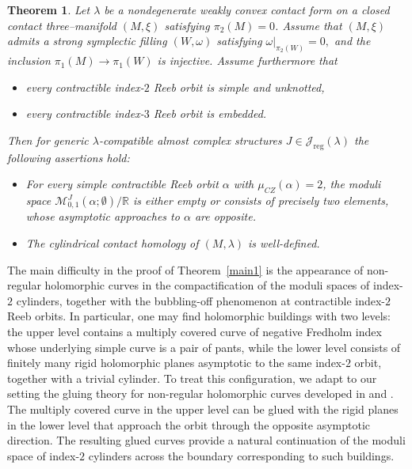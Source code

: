 \documentclass{amsart}
\newtheorem{theorem}{Theorem}[section]
\begin{document}
\begin{theorem}\label{main2}
Let $\lambda$ be a nondegenerate weakly convex contact form on a closed
contact three--manifold $(M,\xi)$ satisfying $\pi_2(M)=0$. 
Assume that $(M,\xi)$ admits a strong symplectic filling $(W,\omega)$
satisfying $\omega|_{\pi_2(W)}=0,$
and the inclusion
$\pi_1(M)\to\pi_1(W)$
is injective.
Assume furthermore that
\begin{itemize}
\item every contractible index-$2$ Reeb orbit is simple and unknotted,
\item every contractible index-$3$ Reeb orbit is embedded.
\end{itemize}
Then for generic $\lambda$-compatible almost complex structures
$J\in\mathcal{J}_{\mathrm{reg}}(\lambda)$ the following assertions hold:

\begin{itemize}
\item[(i)] For every simple contractible Reeb orbit $\alpha$ with
$\mu_{CZ}(\alpha)=2$, the moduli space
$
\mathcal{M}^J_{0,1}(\alpha;\emptyset)/\mathbb{R}
$
is either empty or consists of precisely two elements,
whose asymptotic approaches to $\alpha$ are opposite.

\item[(ii)] The cylindrical contact homology of $(M,\lambda)$ is well-defined.
\end{itemize}
\end{theorem}



The main difficulty in the proof of Theorem~\ref{main1} is the
appearance of non-regular holomorphic curves in the compactification of
the moduli spaces of index-$2$ cylinders, together with the bubbling-off
phenomenon at contractible index-$2$ Reeb orbits. In particular, one
may find holomorphic buildings with two levels: the upper level
contains a multiply covered curve of negative Fredholm index whose
underlying simple curve is a pair of pants, while the lower level
consists of finitely many rigid holomorphic planes asymptotic to the same
index-$2$ orbit, together with a trivial cylinder. To treat this configuration, we adapt to our setting the gluing theory
for non-regular holomorphic curves developed in \cite{BH18} and \cite{HT07}. The multiply covered curve in the upper level can be
glued with the rigid planes in the lower level that approach the orbit
through the opposite asymptotic direction. The resulting glued curves
provide a natural continuation of the moduli space of index-$2$
cylinders across the boundary corresponding to such buildings.
\end{document}
